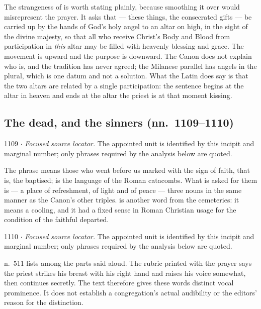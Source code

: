 The strangeness of  is worth stating plainly, because
smoothing it over would misrepresent the prayer. It asks that 
--- these things, the consecrated gifts --- be carried up by the hands of God's
holy angel to an altar on high, in the sight of the divine majesty, so that all
who receive Christ's Body and Blood from participation in \emph{this} altar may
be filled with heavenly blessing and grace. The movement is upward and the
purpose is downward. The Canon does not explain who  is, and the tradition has never agreed; the Milanese parallel has angels
in the plural, which is one datum and not a solution. What the Latin does say is
that the two altars are related by a single participation: the sentence begins
at the altar in heaven and ends at the altar the priest is at that moment
kissing.

\subsection*{The dead, and the sinners (nn.~1109--1110)}

\begin{appointed}{1109 $\cdot$ }
\textit{Focused source locator.} The appointed unit is identified by this incipit and marginal number; only phrases required by the analysis below are quoted.
\end{appointed}

The phrase  means those who went before us marked with
the sign of faith, that is, the baptised;  is
the language of the Roman catacombs. What is asked for them is
 --- a place of refreshment, of
light and of peace --- three nouns in the same manner as the Canon's other
triples.  is another word from the cemeteries: it means a
cooling, and it had a fixed sense in Roman Christian usage for the condition of
the faithful departed.

\begin{appointed}{1110 $\cdot$ }
\textit{Focused source locator.} The appointed unit is identified by this incipit and marginal number; only phrases required by the analysis below are quoted.
\end{appointed}

 n.~511 lists  among the parts said aloud. The rubric printed with the prayer
says the priest strikes his breast with his right hand and raises his voice
somewhat, then continues secretly. The text therefore gives these words
distinct vocal prominence. It does not establish a congregation's actual
audibility or the editors' reason for the distinction.


